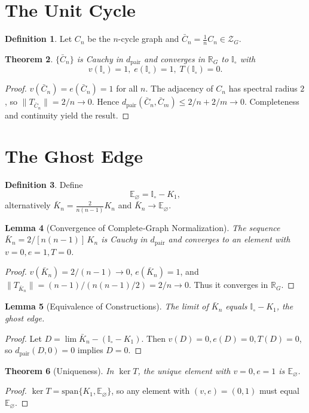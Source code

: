 \documentclass[11pt]{article}
\theoremstyle{definition}
\newtheorem{definition}{Definition}[section]
\theoremstyle{plain}
\newtheorem{theorem}[definition]{Theorem}
\newtheorem{lemma}[definition]{Lemma}
\theoremstyle{remark}
\begin{document}
\section{The Unit Cycle}
\begin{definition}
Let $C_n$ be the $n$-cycle graph and $\bar C_n=\frac1n C_n\in\mathcal Z_G$.
\end{definition}

\begin{theorem}
$\{\bar C_n\}$ is Cauchy in $d_{\mathrm{pair}}$ and converges in $\mathbb R_G$ to $\mathbb I_\circ$ with
\[v(\mathbb I_\circ)=1,\;e(\mathbb I_\circ)=1,\;T(\mathbb I_\circ)=0.
\]
\end{theorem}
\begin{proof}
$v(\bar C_n)=e(\bar C_n)=1$ for all $n$.  The adjacency of $C_n$ has spectral radius $2$, so $\|T_{\bar C_n}\|=2/n\to0$.  Hence $d_{\mathrm{pair}}(\bar C_n,\bar C_m)\le2/n+2/m\to0$.  Completeness and continuity yield the result.
\end{proof}

\section{The Ghost Edge}
\begin{definition}
Define
\[\mathbb E_\varnothing=\mathbb I_\circ-K_1,\]
alternatively $\bar K_n=\tfrac{2}{n(n-1)}K_n$ and $\bar K_n\to\mathbb E_\varnothing$.
\end{definition}

\begin{lemma}[Convergence of Complete‐Graph Normalization]
The sequence $\bar K_n=2/[n(n-1)]\,K_n$ is Cauchy in $d_{\mathrm{pair}}$ and converges to an element with $v=0,e=1,T=0$.
\end{lemma}
\begin{proof}
$v(\bar K_n)=2/(n-1)\to0$, $e(\bar K_n)=1$, and $\|T_{\bar K_n}\|=(n-1)/(n(n-1)/2)=2/n\to0$.  Thus it converges in $\mathbb R_G$.
\end{proof}

\begin{lemma}[Equivalence of Constructions]
The limit of $\bar K_n$ equals $\mathbb I_\circ - K_1$, the ghost edge.
\end{lemma}
\begin{proof}
Let $D=\lim\bar K_n - (\mathbb I_\circ-K_1)$.  Then $v(D)=0,e(D)=0,T(D)=0$, so $d_{\mathrm{pair}}(D,0)=0$ implies $D=0$.
\end{proof}

\begin{theorem}[Uniqueness]
In $\ker T$, the unique element with $v=0,e=1$ is $\mathbb E_\varnothing$.
\end{theorem}
\begin{proof}
$\ker T=\mathrm{span}\{K_1,\mathbb E_\varnothing\}$, so any element with $(v,e)=(0,1)$ must equal $\mathbb E_\varnothing$.
\end{proof}
\end{document}
